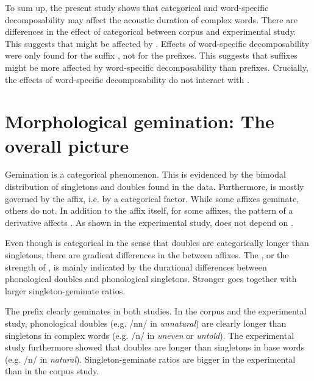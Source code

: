 To sum up, the present study shows that categorical  and word-specific decomposability may affect the {acoustic duration} of complex words.\linebreak
 There are differences in the effect of categorical  between corpus and experimental study. This suggests
that  might be affected by . 
Effects of word-specific decomposability were only found for the suffix , not for the prefixes. This suggests that suffixes might be more affected by word-specific decomposability than prefixes.
 Crucially, the effects of word-specific decomposability do not interact with . 




\section{Morphological gemination: The overall picture}\largerpage

Gemination is a categorical phenomenon. This is evidenced by the bimodal distribution of singletons and doubles found in the data. Furthermore,  is mostly governed by the affix, i.e. by a categorical factor. While some affixes geminate, others do not. In addition to the affix itself, for some affixes, the  pattern of a derivative affects . 
As shown in the experimental study,  does not depend on .

Even though  is categorical in the sense that doubles are categorically longer than singletons, there are gradient differences in the  between affixes. The , or the strength of , is mainly indicated by the durational differences between phonological doubles and phonological singletons. Stronger  goes together with larger singleton-geminate ratios. 


The prefix  clearly geminates in both studies. In the corpus and the experimental study, phonological doubles (e.g. /nn/ in \textit{unnatural}) are clearly longer than singletons in complex words (e.g. /n/ in \textit{uneven} or \textit{untold}). The experimental study furthermore showed that doubles are longer than singletons in base words  (e.g. /n/ in \textit{natural}). Singleton-geminate ratios are bigger in the experimental than in the corpus study.

